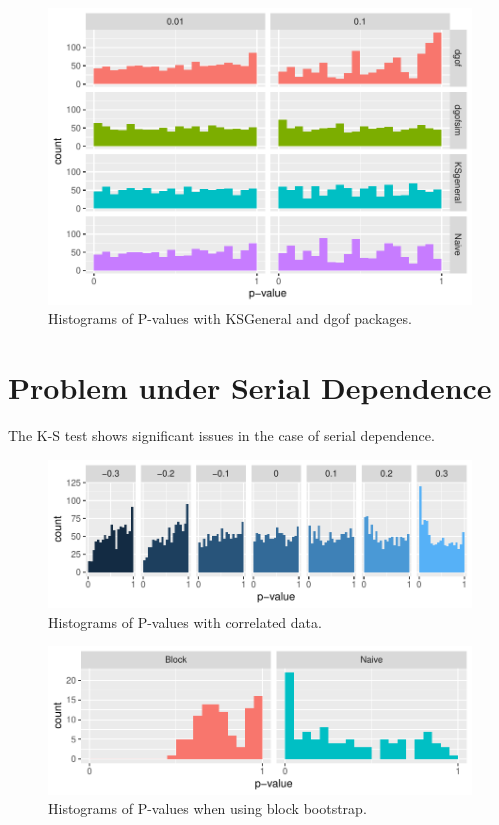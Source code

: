 \documentclass[12pt, letterpaper, titlepage]{article}
\begin{document}
\begin{figure}[tbp]
  \centering
  \includegraphics{hist_general}
  \caption{Histograms of P-values with KSGeneral and dgof packages.}
  \label{fig:hist_general}
\end{figure}

\hypertarget{sec:correlation}{%
\section{Problem under Serial Dependence}\label{sec:correlation}}

The K-S test shows significant issues in the case of serial dependence.

\begin{figure}[tbp]
  \centering
  \includegraphics{hist_correlation}
  \caption{Histograms of P-values with correlated data.}
  \label{fig:hist_correlation}
\end{figure}

\begin{figure}[tbp]
  \centering
  \includegraphics{hist_block}
  \caption{Histograms of P-values when using block bootstrap.}
  \label{fig:hist_block}
\end{figure}
\end{document}
